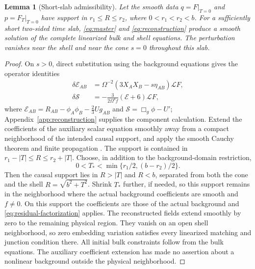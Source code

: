 \documentclass[11pt]{article}
\newtheorem{lemma}[theorem]{Lemma}
\theoremstyle{remark}
\begin{document}
\begin{lemma}[Short-slab admissibility]
\label{lem:admissibility}
Let the smooth data $q=F|_{T=0}$ and $p=F_T|_{T=0}$ have support in
$r_1\le R\le r_2$, where $0<r_1<r_2<b$. For a sufficiently short
two-sided time slab, \eqref{eq:master} and \eqref{eq:reconstruction}
produce a smooth solution of the complete linearized bulk and shell
equations. The perturbation vanishes near the shell and near the cone
$s=0$ throughout this slab.
\end{lemma}
\begin{proof}
On $s>0$, direct substitution using the background equations gives the
operator identities
\begin{align}
 \delta\mathscr E_{AB}
 &=\Omega^{-2}(3X_AX_B-s\eta_{AB})\mathscr L F,\nonumber\\
 \delta\mathscr S
 &=-\frac{3}{2\Omega^4f}(\mathcal E+6)\mathscr L F,
 \label{eq:residual-factorization}
\end{align}
where $\mathscr E_{AB}=R_{AB}-\phi_A\phi_B-\tfrac23U g_{AB}$ and
$\mathscr S=\Box_g\phi-U'$; Appendix~\ref{app:reconstruction} supplies
the component calculation.
Extend the coefficients of the auxiliary scalar equation smoothly away
from a compact neighborhood of the intended causal support, and apply
the smooth Cauchy theorem and finite propagation
\cite[Theorem 3.2.11]{BarGinouxPfaffle2007}.
The support is contained in
$r_1-|T|\le R\le r_2+|T|$.
Choose, in addition to the background-domain restriction,
\begin{equation}
 0<T_*<\min\{r_1/2,(b-r_2)/2\}.
 \label{eq:precontact-time}
\end{equation}
Then the causal support lies in $R>|T|$ and $R<b$, separated from both
the cone and the shell $R=\sqrt{b^2+T^2}$. Shrink $T_*$ further, if needed,
so this support remains in the neighborhood where the actual background
coefficients are smooth and $f\ne0$. On this support the coefficients
are those of the actual background and
\eqref{eq:residual-factorization} applies. The reconstructed fields extend
smoothly by zero to the remaining physical region. They vanish on an open
shell neighborhood, so zero embedding variation satisfies every linearized
matching and junction condition there. All initial bulk constraints follow
from the bulk equations. The auxiliary coefficient extension has made no
assertion about a nonlinear background outside the physical neighborhood.
\end{proof}
\end{document}
